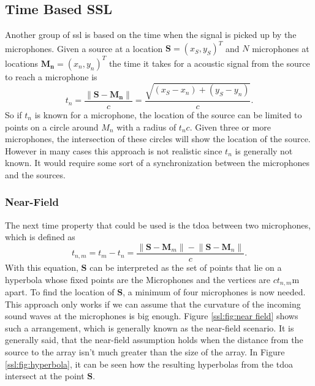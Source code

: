 \subsection{Time Based SSL}
Another group of \acrshort*{ssl} is based on the time when the
signal is picked up by the microphones.
Given a source at a location $\bm{S} = (x_S,y_S)^T$ and $N$ microphones at locations
$\bm{M_n} = (x_n,y_n)^T$ the time it takes for a acoustic signal from the source to reach a microphone is
\begin{equation}
	t_n = \frac{\lVert \bm{S} - \bm{M_n}\rVert}{c}
	= \frac{\sqrt{\left(x_S - x_n\right) + \left(y_S - y_n\right)}}{c} .
\end{equation}
So if $t_n$ is known for a microphone, the location of the source can be limited to points on a circle
around $M_n$ with a radius of $t_n c$.
Given three or more microphones, the intersection of these circles will show the location of the source.
However in many cases this approach is not realistic since $t_n$ is generally not known.
It would require some sort of a synchronization between the microphones and the sources.
\subsubsection{Near-Field}
The next time property that could be used is the \acrfull{tdoa} between
two microphones, which is defined as
\begin{equation}
	t_{n, m} = t_m - t_n = \frac{\lVert \bm{S} - \bm{M}_m\rVert - \lVert \bm{S} - \bm{M}_n\rVert}{c}.
\end{equation}
With this equation, $\bm{S}$ can be interpreted as the set of points that lie on a hyperbola
whose fixed points are the Microphones and the vertices are $c t_{n,m}$m apart.
To find the location of $\bm{S}$, a minimum of four microphones is now needed.
This approach only works if we can assume that the curvature of the incoming sound waves
at the microphones is big enough. Figure \ref{ssl:fig:near field} shows such a arrangement,
which is generally known as the near-field scenario.
It is generally said, that the near-field assumption holds when the distance from the source
to the array isn't much greater than the size of the array.
In Figure \ref{ssl:fig:hyperbola}, it can be seen how the resulting hyperbolas from the
\acrshort{tdoa} intersect at the point $\bm{S}$.


